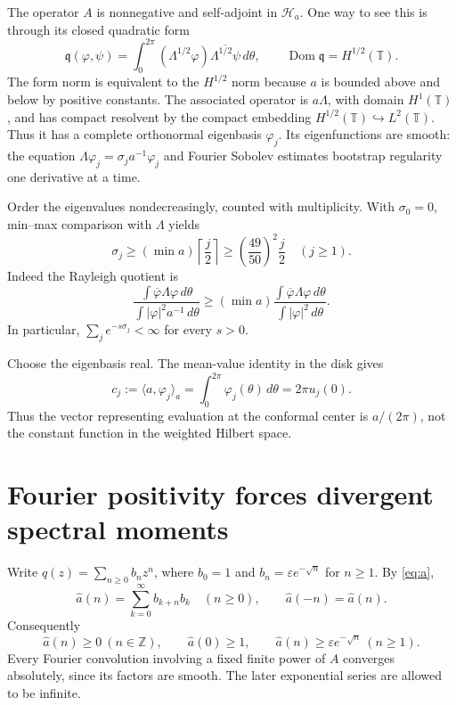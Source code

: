 \documentclass[11pt]{article}
\theoremstyle{remark}
\newcommand{\T}{\mathbb T}
\newcommand{\Hh}{\mathcal H}
\newcommand{\eps}{\varepsilon}
\newcommand{\ip}[2]{\langle #1,#2\rangle_a}
\newcommand{\an}{\widehat a}
\begin{document}
The operator $A$ is nonnegative and self-adjoint in $\Hh_a$. One way to see this is through its closed quadratic form
\[
 \mathfrak q(\varphi,\psi)=\int_0^{2\pi}(\Lambda^{1/2}\varphi)
 \overline{\Lambda^{1/2}\psi}\,d\theta,
 \qquad \operatorname{Dom}\mathfrak q=H^{1/2}(\T).
\]
The form norm is equivalent to the $H^{1/2}$ norm because $a$ is bounded above and below by positive constants. The associated operator is $a\Lambda$, with domain $H^1(\T)$, and has compact resolvent by the compact embedding $H^{1/2}(\T)\hookrightarrow L^2(\T)$. Thus it has a complete orthonormal eigenbasis $\varphi_j$. Its eigenfunctions are smooth: the equation $\Lambda\varphi_j=\sigma_j a^{-1}\varphi_j$ and Fourier Sobolev estimates bootstrap regularity one derivative at a time.

Order the eigenvalues nondecreasingly, counted with multiplicity. With $\sigma_0=0$, min--max comparison with $\Lambda$ yields
\begin{equation}\label{eq:growth}
 \sigma_j\geq (\min a)\left\lceil\frac j2\right\rceil
 \geq\left(\frac{49}{50}\right)^2\frac j2
 \quad(j\geq1).
\end{equation}
Indeed the Rayleigh quotient is
\[
 \frac{\int\overline\varphi\Lambda\varphi\,d\theta}
      {\int|\varphi|^2a^{-1}\,d\theta}
 \geq (\min a)
 \frac{\int\overline\varphi\Lambda\varphi\,d\theta}
      {\int|\varphi|^2\,d\theta}.
\]
In particular, $\sum_j e^{-s\sigma_j}<\infty$ for every $s>0$.

Choose the eigenbasis real. The mean-value identity in the disk gives
\begin{equation}\label{eq:eval}
 c_j:=\ip{a}{\varphi_j}
 =\int_0^{2\pi}\varphi_j(\theta)\,d\theta
 =2\pi u_j(0).
\end{equation}
Thus the vector representing evaluation at the conformal center is $a/(2\pi)$, not the constant function in the weighted Hilbert space.

\section{Fourier positivity forces divergent spectral moments}
Write $q(z)=\sum_{n\geq0}b_n z^n$, where $b_0=1$ and $b_n=\eps e^{-\sqrt n}$ for $n\geq1$. By \eqref{eq:a},
\begin{equation}\label{eq:apos}
 \an(n)=\sum_{k=0}^\infty b_{k+n}b_k\quad(n\geq0),
 \qquad \an(-n)=\an(n).
\end{equation}
Consequently
\begin{equation}\label{eq:tail}
 \an(n)\geq0\ (n\in\mathbb Z),\qquad
 \an(0)\geq1,\qquad
 \an(n)\geq\eps e^{-\sqrt n}\ (n\geq1).
\end{equation}
Every Fourier convolution involving a fixed finite power of $A$ converges absolutely, since its factors are smooth. The later exponential series are allowed to be infinite.
\end{document}
